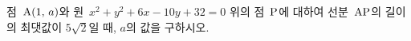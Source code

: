 점~$\mathrm{A}(1,\,a)$와 원~$x^2+y^2+6x-10y+32=0$ 위의 점~$\mathrm{P}$에 대하여 선분~$\mathrm{AP}$의 길이의 최댓값이 $5\sqrt{2}$일 때, $a$의 값을 구하시오. 
